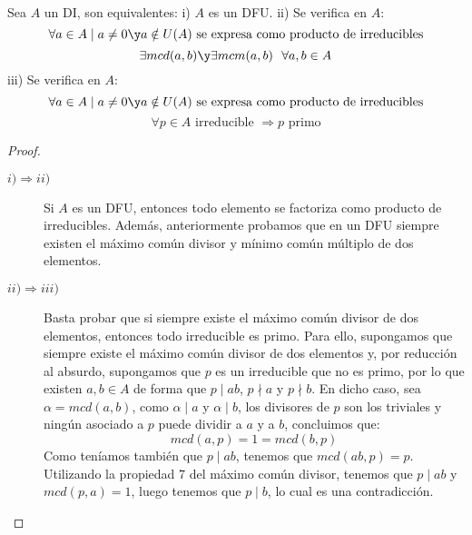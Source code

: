 \begin{teo}
    \ \\
    \label{teoCaracDFU}
    Sea $A$ un DI, son equivalentes:\newline
    i) $A$ es un DFU.\newline
    ii) Se verifica en $A$:
    $$\forall a \in A \mid a\neq 0 \y a \notin U(A) \mbox{ se expresa como producto de irreducibles}$$
    $$\exists mcd(a,b) \y \exists mcm(a,b)~~\forall a,b \in A$$
    iii) Se verifica en $A$:
    $$\forall a \in A \mid a\neq 0 \y a \notin U(A) \mbox{ se expresa como producto de irreducibles}$$
    $$\forall p \in A \mbox{ irreducible } \Rightarrow p \mbox{ primo}$$
\begin{proof}
    \begin{description}
        \item [$i) \Longrightarrow ii)$] Si $A$ es un DFU, entonces todo elemento se factoriza como producto de irreducibles. Además, anteriormente probamos que en un DFU siempre existen el máximo común divisor y mínimo común múltiplo de dos elementos.
        \item [$ii) \Longrightarrow iii)$] Basta probar que si siempre existe el máximo común divisor de dos elementos, entonces todo irreducible es primo. Para ello, supongamos que siempre existe el máximo común divisor de dos elementos y, por reducción al absurdo, supongamos que $p$ es un irreducible que no es primo, por lo que existen $a,b\in A$ de forma que $p\mid ab$, $p\nmid a$ y $p\nmid b$. En dicho caso, sea $\alpha = mcd(a,b)$, como $\alpha \mid a$ y $\alpha \mid b$, los divisores de $p$ son los triviales y ningún asociado a $p$ puede dividir a $a$ y a $b$, concluimos que:
            \begin{equation*}
                mcd(a,p) = 1 = mcd(b,p)
            \end{equation*}
            Como teníamos también que $p \mid ab$, tenemos que $mcd(ab,p) = p$. Utilizando la propiedad 7 del máximo común divisor, tenemos que $p\mid ab$ y $mcd(p,a) = 1$, luego tenemos que $p\mid b$, lo cual es una contradicción.


\end{description}
\end{proof}
\end{teo}
